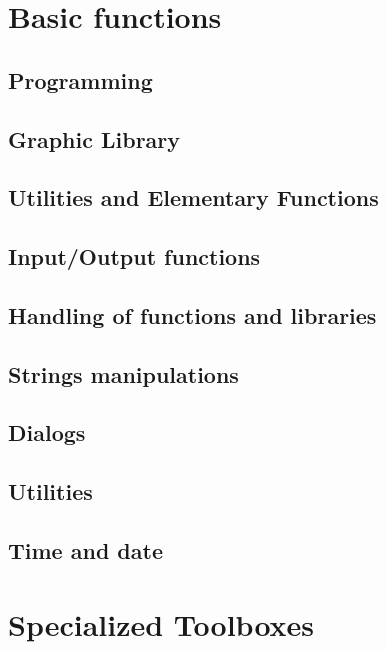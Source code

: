 \chapter{Basic functions}
\section{Programming}
         
\section{Graphic Library }
         
\section{Utilities and Elementary Functions}
         
\section{Input/Output functions}
         
\section{Handling of functions and libraries}
        
\section{Strings manipulations}
        
\section{Dialogs}
        
\section{Utilities}
        
\section{Time and date}
        
\chapter{Specialized Toolboxes}
